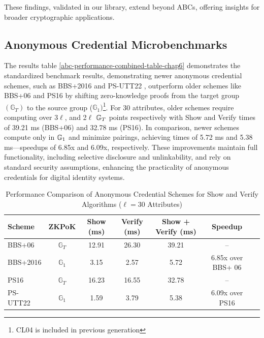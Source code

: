 These findings, validated in our library, extend beyond ABCs, offering insights for broader cryptographic applications.



\subsection{Anonymous Credential Microbenchmarks}

The results table \ref{abc-performance-combined-table-chap6} demonstrates the standardized benchmark results, demonstrating newer anonymous credential schemes, such as BBS+2016 \cite{camenisch_anonymous_2016} and PS-UTT22 \cite{tomescu_utt_2022}, outperform older schemes like BBS+06 \cite{hutchison_constant-size_2006} and PS16 \cite{sako_short_2016} by shifting zero-knowledge proofs from the target group $(\mathbb{G}_T)$ to the source group ($\mathbb{G}_1)$\footnote{CL04 \cite{hutchison_signature_2004} is included in previous generation}. For 30 attributes, older schemes require computing over 3$\ell$, and 2$\ell$ $\mathbb{G}_T$ points respectively with Show and Verify times of 39.21 ms (BBS+06) and 32.78 ms (PS16). In comparison, newer schemes compute only in $\mathbb{G}_1$ and minimize pairings, achieving times of 5.72 ms and 5.38 ms—speedups of 6.85x and 6.09x, respectively. These improvements maintain full functionality, including selective disclosure and unlinkability, and rely on standard security assumptions, enhancing the practicality of anonymous credentials for digital identity systems.



\begin{table}[!htbp]
\centering
\caption{Performance Comparison of Anonymous Credential Schemes for Show and Verify Algorithms ($\ell = 30$ Attributes)}
\label{tab:anon_creds_performance_old_gen_vs_new}
\begin{tabular}{|l|c|c|c|c|c|c|}
\hline
\textbf{Scheme} & \textbf{ZKPoK}  & \textbf{Show (ms)} & \textbf{Verify (ms)}  & \textbf{Show + Verify (ms)} & \textbf{Speedup} \\
\hline
BBS+06 & $\mathbb{G}_T$ & 12.91  & 26.30 & 39.21 & -- \\
\hline
BBS+2016 & $\mathbb{G}_1$ & 3.15  & 2.57 & 5.72 & 6.85x over BBS+ 06 \\
\hline
PS16 & $\mathbb{G}_T$ & 16.23  & 16.55 & 32.78 & -- \\
\hline
PS-UTT22 & $\mathbb{G}_1$ & 1.59  & 3.79 & 5.38 & 6.09x over PS16 \\
\hline
\end{tabular}
\end{table}















